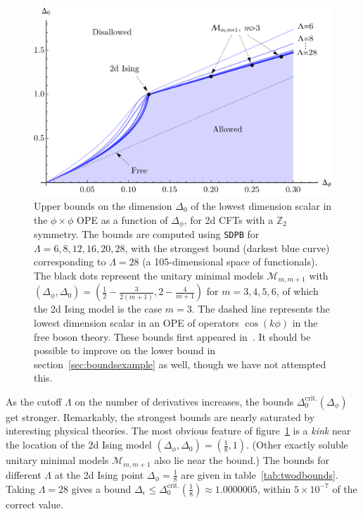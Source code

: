 \documentclass{ws-rv9x6}
\newcommand\f\phi
\newcommand\e\epsilon
\newcommand\<\langle
\renewcommand\>\rangle
\newcommand\Z{\mathbb{Z}}
\renewcommand\.{\cdot}
\newcommand\x\times
\newcommand\De{\Delta}
\begin{document}
\begin{figure}[hrt!]
\begin{center}
\includegraphics[width=\textwidth]{2dBound}
\end{center}
\caption{\label{fig:2dbound}
Upper bounds on the dimension $\De_0$ of the lowest dimension scalar in the $\f\x\f$ OPE as a function of $\De_\f$, for 2d CFTs with a $\Z_2$ symmetry. The bounds are computed using {\tt SDPB} for $\Lambda=6,8,12,16,20,28$, with the strongest bound (darkest blue curve) corresponding to $\Lambda=28$ (a 105-dimensional space of functionals). The black dots represent the unitary minimal models $\mathcal{M}_{m,m+1}$ with $(\De_\f,\De_0)=(\frac 1 2 - \frac{3}{2(m+1)},2-\frac{4}{m+1})$ for $m=3,4,5,6$, of which the 2d Ising model is the case $m=3$.  The dashed line represents the lowest dimension scalar in an OPE of operators $\cos(k\phi)$ in the free boson theory.  These bounds first appeared in~\cite{Rychkov:2009ij}. It should be possible to improve on the lower bound in section~\ref{sec:boundsexample} as well, though we have not attempted this.
}
\end{figure}

As the cutoff $\Lambda$ on the number of derivatives increases, the bounds $\De_0^\mathrm{crit.}(\De_\f)$ get stronger. Remarkably, the strongest bounds are nearly saturated by interesting physical theories. The most obvious feature of figure~\ref{fig:2dbound} is a {\it kink\/} near the location of the 2d Ising model $(\De_\f,\De_0)=(\frac 1 8,1)$.  (Other exactly soluble unitary minimal models $\mathcal{M}_{m,m+1}$ also lie near the bound.) The bounds for different $\Lambda$ at the 2d Ising point $\De_\f=\frac 1 8$ are given in table~\ref{tab:twodbounds}.  Taking $\Lambda=28$ gives a bound $\De_\e \leq \De_0^\mathrm{crit.}(\frac 1 8)\approx 1.0000005$, within $5\x 10^{-7}$ of the correct value.
\end{document}
